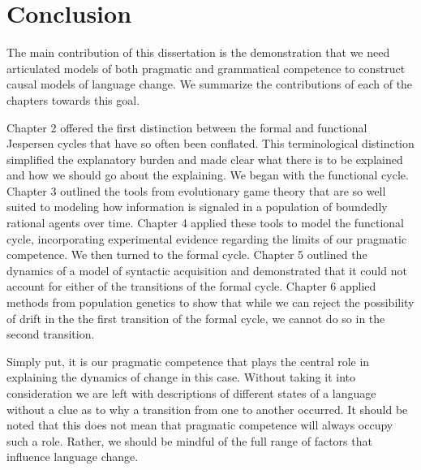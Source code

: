 \chapter{Conclusion}
\label{conclusion}

The main contribution of this dissertation is the demonstration that we need articulated models of both pragmatic and grammatical competence to construct causal models of language change. We summarize the contributions of each of the chapters towards this goal. 

Chapter 2 offered the first distinction between the formal and functional Jespersen cycles that have so often been conflated. This terminological distinction simplified the explanatory burden and made clear what there is to be explained and how we should go about the explaining. We began with the functional cycle. Chapter 3 outlined the tools from evolutionary game theory that are so well suited to modeling how information is signaled in a population of boundedly rational agents over time. Chapter 4 applied these tools to model the functional cycle, incorporating experimental evidence regarding the limits of our pragmatic competence. We then turned to the formal cycle. Chapter 5 outlined the dynamics of a model of syntactic acquisition and demonstrated that it could not account for either of the transitions of the formal cycle. Chapter 6 applied methods from population genetics to show that while  we can reject the possibility of drift in the the first transition of the formal cycle, we  cannot do so in the second transition. 

Simply put, it is our pragmatic competence that plays the central role in explaining the dynamics of change in this case. Without taking it into consideration we are left with descriptions of different states of a language without a clue as to why a transition from one to another occurred. It should be noted that this does not mean that pragmatic competence will always occupy such a role. Rather, we should be mindful of the full range of factors that influence language change.

